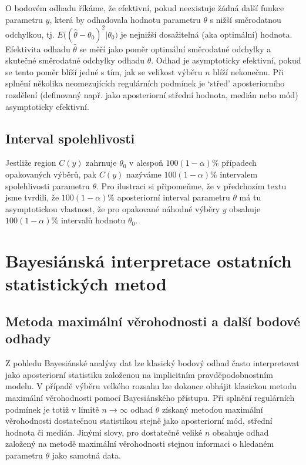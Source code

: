 O bodovém odhadu říkáme, že efektivní, pokud neexistuje žádná další funkce parametru $y$, která by odhadovala hodnotu parametru $\theta$ s nižší směrodatnou odchylkou, tj. $E\big((\hat{\theta} - \theta_0)^2 | \theta_0 \big)$ je nejnižší dosažitelná (aka optimální) hodnota. Efektivita odhadu $\hat{\theta}$ se měří jako poměr optimální směrodatné odchylky a skutečné směrodatné odchylky odhadu $\hat{\theta}$. Odhad je asymptoticky efektivní, pokud se tento poměr blíží jedné s tím, jak se velikost výběru $n$ blíží nekonečnu. Při splnění několika neomezujících regulárních podmínek je `střed' aposteriorního rozdělení (definovaný např. jako aposteriorní střední hodnota, medián nebo mód) asymptoticky efektivní.

\subsection{Interval spolehlivosti}

Jestliže region $C(y)$ zahrnuje $\theta_0$ v alespoň $100(1 - \alpha)\%$ případech opakovaných výběrů, pak $C(y)$ nazýváme $100(1 - \alpha)\%$ intervalem spolehlivosti parametru $\theta$. Pro ilustraci si připomeňme, že v předchozím textu jsme tvrdili, že $100(1 - \alpha)\%$ aposteriorní interval parametru $\theta$ má tu asymptotickou vlastnost, že pro opakované náhodné výběry $y$ obsahuje $100(1 - \alpha)\%$ intervalů hodnotu $\theta_0$.

\section{Bayesiánská interpretace ostatních statistických metod}

\subsection{Metoda maximální věrohodnosti a další bodové odhady}

Z pohledu Bayesiánské analýzy dat lze klasický bodový odhad často interpretovat jako aposteriorní statistiku založenou na implicitním pravděpodobnostním modelu. V případě výběru velkého rozsahu lze dokonce obhájit klasickou metodu maximální věrohodnosti pomocí Bayesiánského přístupu. Při splnění regulárních podmínek je totiž v limitě $n \rightarrow \infty$ odhad $\hat{\theta}$ získaný metodou maximální věrohodnosti  dostatečnou statistikou stejně jako aposteriorní mód, střední hodnota či medián. Jinými slovy, pro dostatečně veliké $n$ obsahuje odhad založený na metodě maximální věrohodnosti stejnou informaci o hledaném parametru $\theta$ jako samotná data.

